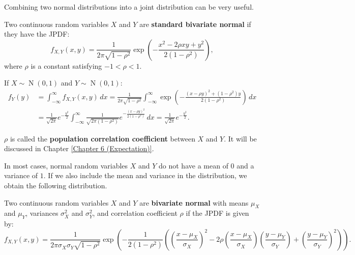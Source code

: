 \documentclass{huhtakm-template-book-v2}
\DeclareMathOperator{\N}{N}
\begin{document}
    Combining two normal distributions into a joint distribution can be very useful.
    \begin{eg}
        Two continuous random variables $X$ and $Y$ are \textbf{standard bivariate normal} if they have the JPDF:
        \begin{equation*}
            f_{X,Y}(x, y) = \frac{1}{2\pi\sqrt{1-\rho^{2}}}\exp\left(-\frac{x^{2}-2\rho xy+y^{2}}{2(1-\rho^{2})}\right),
        \end{equation*}
        where $\rho$ is a constant satisfying $-1 < \rho < 1$.
    \end{eg}
    \begin{rem}
        If $X \sim \N(0,1)$ and $Y \sim \N(0,1)$:
        \begin{align*}
            f_{Y}(y) &= \int_{-\infty}^{\infty} f_{X,Y}(x, y)\,dx = \frac{1}{2\pi\sqrt{1-\rho^{2}}}\int_{-\infty}^{\infty}\exp\left(-\frac{(x-\rho y)^{2}+(1-\rho^{2})y}{2(1-\rho^{2})}\right)\,dx\\
            &= \frac{1}{\sqrt{2\pi}}e^{-\frac{y^{2}}{2}}\int_{-\infty}^{\infty}\frac{1}{\sqrt{2\pi(1-\rho^{2})}}e^{-\frac{(x-\rho y)^{2}}{2(1-\rho^{2})}}\,dx = \frac{1}{\sqrt{2\pi}}e^{-\frac{y^{2}}{2}}.
        \end{align*}
    \end{rem}
    \begin{rem}
        $\rho$ is called the \textbf{population correlation coefficient} between $X$ and $Y$. It will be discussed in Chapter \ref{Chapter 6 (Expectation)}.
    \end{rem}
    In most cases, normal random variables $X$ and $Y$ do not have a mean of $0$ and a variance of $1$. If we also include the mean and variance in the distribution, we obtain the following distribution.
    \begin{eg}
        Two continuous random variables $X$ and $Y$ are \textbf{bivariate normal} with means $\mu_{X}$ and $\mu_{Y}$, variances $\sigma_{X}^{2}$ and $\sigma_{Y}^{2}$, and correlation coefficient $\rho$ if the JPDF is given by:
        \begin{equation*}
            f_{X,Y}(x, y) = \frac{1}{2\pi\sigma_{X}\sigma_{Y}\sqrt{1-\rho^{2}}}\exp\left(-\frac{1}{2(1-\rho^{2})}\left(\left(\frac{x-\mu_{X}}{\sigma_{X}}\right)^{2}-2\rho\left(\frac{x-\mu_{X}}{\sigma_{X}}\right)\left(\frac{y-\mu_{Y}}{\sigma_{Y}}\right)+\left(\frac{y-\mu_{Y}}{\sigma_{Y}}\right)^{2}\right)\right).
        \end{equation*}
    \end{eg}
\end{document}
